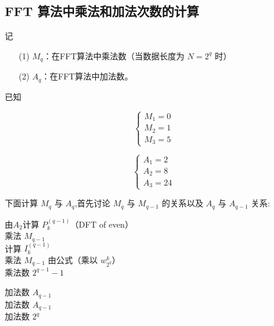 \documentclass[linespread=1.5,openany]{book}%
\theoremstyle{plain}
\begin{document}
{{{					\subsection{FFT 算法中乘法和加法次数的计算}
					记\begin{itemize}
						\item[(1)] \(M_q\)：在FFT算法中乘法数（当数据长度为 \(N = 2^q\) 时）\\
						\item[(2)]\(A_q\)：在FFT算法中加法数。
					\end{itemize} 已知
					\begin{minipage}[t]{0.45\textwidth}
						\[
						\begin{cases}
							M_1 = 0 \\
							M_2 = 1 \\
							M_3 = 5
						\end{cases}
						\]
					\end{minipage}
					\hfill
					\vrule width 0.4pt
					\begin{minipage}[t]{0.45\textwidth}
						\[
						\begin{cases}
							A_1 = 2 \\
							A_2 = 8 \\
							A_3 = 24
						\end{cases}
						\]
					\end{minipage}
					下面计算 \(M_q\) 与 \(A_q\),首先讨论 \(M_q\) 与 \(M_{q - 1}\) 的关系以及 \(A_q\) 与 \(A_{q - 1}\) 关系:
					\begin{minipage}[t]{0.45\textwidth}
						\begin{center}
							由$A_2$计算 \(P_k^{(q - 1)}\)（DFT of even）\\
							乘法 \(M_{q - 1}\)\\
							计算 \(I_k^{(q - 1)}\)
							\\乘法 \(M_{q - 1}\)
							由公式（乘以 \(w_{2^q}^{k}\)）
							\\ 乘法数 \(2^{q - 1} - 1\)
						\end{center}
					\end{minipage}
					\hfill
					\vrule width 0.4pt
					\hfill
					\begin{minipage}[t]{0.45\textwidth}
						加法数 \(A_{q - 1}\)\\
						
						加法数 \(A_{q - 1}\)\\
						
						加法数 \(2^q\)\\
					\end{minipage}
					
}}}
\end{document}
